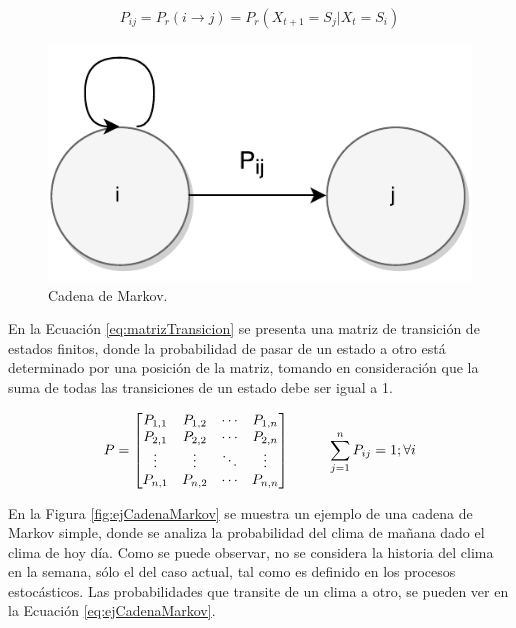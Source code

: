 \begin{equation} \label{eq:transicionMarkov}
	P_{ij} = P_r(i \rightarrow j) = P_r(X_{t+1} = S_j | X_t = S_i)
\end{equation}

\begin{figure}[ht!]
  \centering
    \includegraphics[scale=0.6]{images/CadenaMarkov.pdf}
  \caption{Cadena de Markov.}
  \label{fig:cadenaMarkov}
\end{figure}

En la Ecuación \ref{eq:matrizTransicion} se presenta una matriz de transición de estados finitos, donde la probabilidad de pasar de un estado a otro está determinado por una posición de la matriz, tomando en consideración que la suma de todas las transiciones de un estado debe ser igual a 1.

\begin{equation} \label{eq:matrizTransicion}
	P =
	\begin{bmatrix}
		P_{1,1} & P_{1,2} & \cdots & P_{1,n} \\
		P_{2,1} & P_{2,2} & \cdots & P_{2,n} \\
		\vdots  & \vdots  & \ddots & \vdots  \\
		P_{n,1} & P_{n,2} & \cdots & P_{n,n} \\
	\end{bmatrix}
	\hspace*{1cm} \sum_{j=1}^{n} P_{ij} = 1 ; \forall i
\end{equation}

En la Figura \ref{fig:ejCadenaMarkov} se muestra un ejemplo de una cadena de Markov simple, donde se analiza la probabilidad del clima de mañana dado el clima de hoy día. Como se puede observar, no se considera la historia del clima en la semana, sólo el del caso actual, tal como es definido en los procesos estocásticos. Las probabilidades que transite de un clima a otro, se pueden ver en la Ecuación \ref{eq:ejCadenaMarkov}.

